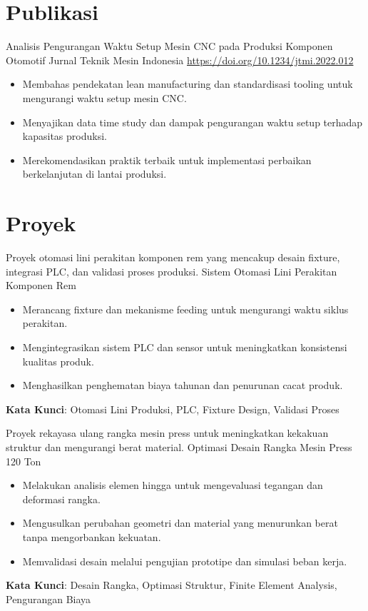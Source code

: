 \documentclass[a4paper, serif, 10pt]{moderncv}
\begin{document}
\section{Publikasi}

        {Analisis Pengurangan Waktu Setup Mesin CNC pada Produksi Komponen Otomotif}
        {Jurnal Teknik Mesin Indonesia}
        {\url{https://doi.org/10.1234/jtmi.2022.012}}
        {}
        {\begin{itemize}
\item Membahas pendekatan lean manufacturing dan standardisasi tooling untuk mengurangi waktu setup mesin CNC.
\item Menyajikan data time study dan dampak pengurangan waktu setup terhadap kapasitas produksi.
\item Merekomendasikan praktik terbaik untuk implementasi perbaikan berkelanjutan di lantai produksi.
\end{itemize}}
\section{Proyek}

        {Proyek otomasi lini perakitan komponen rem yang mencakup desain fixture, integrasi PLC, dan validasi proses produksi.
}
        {Sistem Otomasi Lini Perakitan Komponen Rem}
        {}
        {}
        {\begin{itemize}
\item Merancang fixture dan mekanisme feeding untuk mengurangi waktu siklus perakitan.
\item Mengintegrasikan sistem PLC dan sensor untuk meningkatkan konsistensi kualitas produk.
\item Menghasilkan penghematan biaya tahunan dan penurunan cacat produk.
\end{itemize}
\textbf{Kata Kunci}: Otomasi Lini Produksi, PLC, Fixture Design, Validasi Proses}

        {Proyek rekayasa ulang rangka mesin press untuk meningkatkan kekakuan struktur dan mengurangi berat material.
}
        {Optimasi Desain Rangka Mesin Press 120 Ton}
        {}
        {}
        {\begin{itemize}
\item Melakukan analisis elemen hingga untuk mengevaluasi tegangan dan deformasi rangka.
\item Mengusulkan perubahan geometri dan material yang menurunkan berat tanpa mengorbankan kekuatan.
\item Memvalidasi desain melalui pengujian prototipe dan simulasi beban kerja.
\end{itemize}
\textbf{Kata Kunci}: Desain Rangka, Optimasi Struktur, Finite Element Analysis, Pengurangan Biaya}
\end{document}
